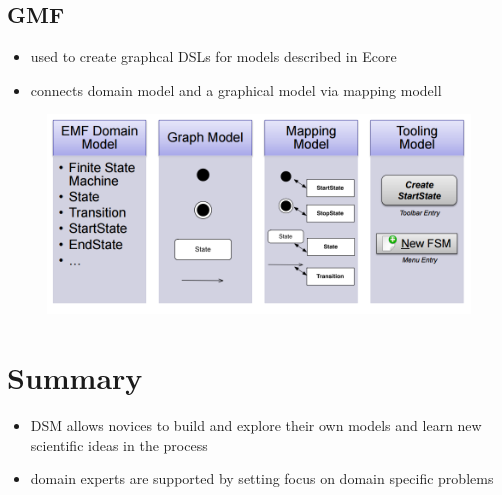 \documentclass[runningheads,a4paper]{llncs}
\begin{document}
    \subsection{GMF}
     \begin{itemize}
     \item used to create graphcal DSLs for  models described in Ecore
     \item connects domain model and a graphical model via mapping modell
    \end{itemize}
    
    \begin{figure}[ht]
      \centering
      \includegraphics[width=\textwidth]{images/TableGMFSteps.PNG}
    \end{figure}

\section{Summary}\label{sec:summary}
\begin{itemize}
 \item DSM allows novices to build and explore 
their own models and learn new scientific ideas in the process
\item domain experts are supported by setting focus on domain specific problems
\end{itemize}

  
% 
% 
\nocite{*}



\end{document}
